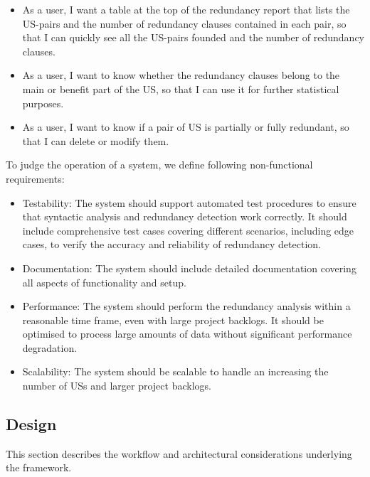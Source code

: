 \begin{itemize}
\item As a user, I want a table at the top of the redundancy report that lists the US-pairs and the number of redundancy clauses contained in each pair, so that I can quickly see all the US-pairs founded and the number of redundancy clauses.

\item As a user, I want to know whether the redundancy clauses belong to the main or benefit part of the US, so that I can use it for further statistical purposes.

\item As a user, I want to know if a pair of US is partially or fully redundant, so that I can delete or modify them.
\end{itemize}
To judge the operation of a system, we define following non-functional requirements:
\begin{itemize}
	\item Testability: The system should support automated test procedures to ensure that syntactic analysis and redundancy detection work correctly. It should include comprehensive test cases covering different scenarios, including edge cases, to verify the accuracy and reliability of redundancy detection.
	
	\item Documentation: The system should include detailed documentation covering all aspects of functionality and setup.
	
	\item Performance: The system should perform the redundancy analysis within a reasonable time frame, even with large project backlogs. It should be optimised to process large amounts of data without significant performance degradation.
	
	\item Scalability: The system should be scalable to handle an increasing the number of USs and larger project backlogs.

\end{itemize}

\subsection{Design}\label{desing}
This section describes the workflow and architectural considerations underlying the framework.
